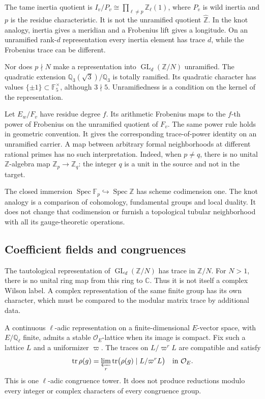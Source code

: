 The tame inertia quotient is \(I_v/P_v\cong\prod_{\ell\ne p}\mathbb
Z_\ell(1)\), where \(P_v\) is wild inertia and \(p\) is the residue
characteristic. It is not the unramified quotient \(\widehat{\mathbb Z}\).
In the knot analogy, inertia gives a meridian and a Frobenius lift gives a
longitude. On an unramified rank-\(d\) representation every inertia element
has trace \(d\), while the Frobenius trace can be different.

Nor does \(p\nmid N\) make a representation into
\(\operatorname{GL}_d(\mathbb Z/N)\) unramified. The quadratic extension
\(\mathbb Q_3(\sqrt3)/\mathbb Q_3\) is totally ramified. Its quadratic
character has values \(\{\pm1\}\subset\mathbb F_5^\times\), although
\(3\nmid5\). Unramifiedness is a condition on the kernel of the
representation.

Let \(E_w/F_v\) have residue degree \(f\). Its arithmetic Frobenius maps to
the \(f\)-th power of Frobenius on the unramified quotient of \(F_v\). The
same power rule holds in geometric convention. It gives the corresponding
trace-of-power identity on an unramified carrier. A map between arbitrary
formal neighborhoods at different rational primes has no such
interpretation. Indeed, when \(p\ne q\), there is no unital \(\mathbb
Z\)-algebra map \(\mathbb Z_p\to\mathbb Z_q\): the integer \(q\) is a unit
in the source and not in the target.

The closed immersion \(\operatorname{Spec}\mathbb
F_p\hookrightarrow\operatorname{Spec}\mathbb Z\) has scheme codimension one.
The knot analogy is a comparison of cohomology, fundamental groups and local
duality. It does not change that codimension or furnish a topological
tubular neighborhood with all its gauge-theoretic operations.

\subsection{Coefficient fields and congruences}

The tautological representation of \(\operatorname{GL}_d(\mathbb Z/N)\) has
trace in \(\mathbb Z/N\). For \(N>1\), there is no unital ring map from this
ring to \(\mathbb C\). Thus it is not itself a complex Wilson label. A
complex representation of the same finite group has its own character, which
must be compared to the modular matrix trace by additional data.

A continuous \(\ell\)-adic representation on a finite-dimensional
\(E\)-vector space, with \(E/\mathbb Q_\ell\) finite, admits a stable
\(\mathcal O_E\)-lattice when its image is compact. Fix such a lattice \(L\)
and a uniformizer \(\varpi\). The traces on \(L/\varpi^rL\) are compatible
and satisfy
\[
 \operatorname{tr}\rho(g)
       =\varprojlim_r\operatorname{tr}
              \bigl(\rho(g)\mid L/\varpi^rL\bigr)
       \quad\text{in }\mathcal O_E.
\]
This is one \(\ell\)-adic congruence tower. It does not produce reductions
modulo every integer or complex characters of every congruence group.

